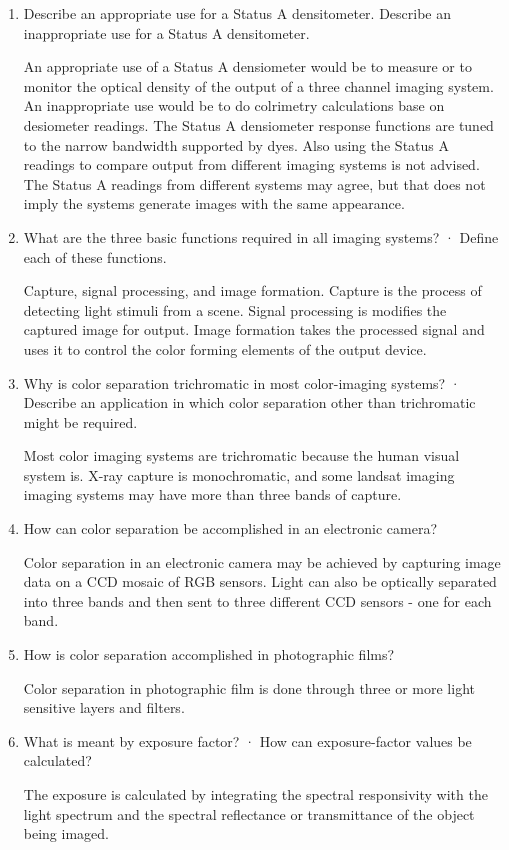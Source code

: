 \begin{enumerate}
\item  Describe an appropriate use for a Status A densitometer.
Describe an inappropriate use for a Status A densitometer.
\par  An appropriate use of a Status A densiometer would be to measure or to monitor
the optical density of the output of a three channel imaging
system.  An inappropriate use would be to do colrimetry
calculations base on desiometer readings.  The Status A
densiometer response functions are tuned to the narrow bandwidth
supported by dyes.  Also using the Status A readings to compare
output from different imaging systems is not advised.  The Status
A readings from different systems may agree, but that does not
imply the systems generate images with the same appearance.

\item What are the three basic functions required in all imaging
systems?
 · Define each of these functions.
\par Capture, signal processing, and image formation.  Capture is
the process of detecting light stimuli from a scene.  Signal
processing is modifies the captured image for output.  Image
formation takes the processed signal and uses it to control the
color forming elements of the output device.

\item Why is color separation trichromatic in most color-imaging
systems?
 · Describe an application in which color separation other than trichromatic might be required.
 \par Most color imaging systems are trichromatic because the
 human visual system is.  X-ray capture is monochromatic, and some landsat imaging imaging systems
 may have more than three bands of capture.

\item How can color separation be accomplished in an electronic
camera?
\par Color separation in an electronic camera may be achieved by
capturing image data on a CCD mosaic of RGB sensors.  Light can
also be optically separated into three bands and then sent to
three different CCD sensors - one for each band.

\item How is color separation accomplished in photographic films?
\par Color separation in photographic film is done through three
or more light sensitive layers and filters.

\item What is meant by exposure factor?
 · How can exposure-factor values be calculated?
\par The exposure is calculated by integrating the spectral
responsivity with the light spectrum and the spectral reflectance
or transmittance of the object being imaged.


\end{enumerate}
